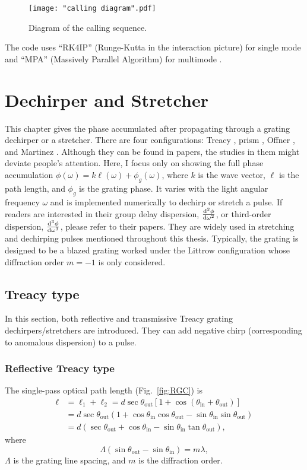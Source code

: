 \documentclass[12pt,hidelinks]{book}
\begin{document}
\begin{figure}[h!]
\centering
\texttt{[image: "calling diagram".pdf]}
\caption{Diagram of the calling sequence.}
\label{fig:calling}
\end{figure}

The code uses ``RK4IP'' (Runge-Kutta in the interaction picture) for single mode \cite{Heidt2009,Balac2013} and ``MPA'' (Massively Parallel Algorithm) for multimode \cite{Wright2018}.

\chapter{Dechirper and Stretcher}
This chapter gives the phase accumulated after propagating through a grating dechirper or a stretcher. There are four configurations: Treacy \cite{Treacy1969}, prism \cite{Dietel1983,Fork1984}, Offner \cite{Offner1971}, and Martinez \cite{Martinez1984,Martinez1985}. Although they can be found in papers, the studies in them might deviate people's attention. Here, I focus only on showing the full phase accumulation $\phi(\omega)=k\ell(\omega)+\phi_g(\omega)$, where $k$ is the wave vector, $\ell$ is the path length, and $\phi_g$ is the grating phase. It varies with the light angular frequency $\omega$ and is implemented numerically to dechirp or stretch a pulse. If readers are interested in their group delay dispersion, $\od[2]{\phi}{\omega}$, or third-order dispersion, $\od[3]{\phi}{\omega}$, please refer to their papers. They are widely used in stretching and dechirping pulses mentioned throughout this thesis. Typically, the grating is designed to be a blazed grating worked under the Littrow configuration whose diffraction order $m=-1$ is only considered.

\section{Treacy type}
In this section, both reflective and transmissive Treacy grating dechirpers/stretchers are introduced. They can add negative chirp (corresponding to anomalous dispersion) to a pulse.

\subsection{Reflective Treacy type}
\label{sec:reflective_grating_pair}
The single-pass optical path length (Fig.~\ref{fig:RGC}) is
\begin{align}
\ell & =\ell_1+\ell_2=d\sec\theta_{\text{out}}\left[1+\cos(\theta_{\text{in}}+\theta_{\text{out}})\right] \nonumber \\
& =d\sec\theta_{\text{out}}\left(1+\cos\theta_{\text{in}}\cos\theta_{\text{out}}-\sin\theta_{\text{in}}\sin\theta_{\text{out}}\right) \nonumber \\
& =d\left(\sec\theta_{\text{out}}+\cos\theta_{\text{in}}-\sin\theta_{\text{in}}\tan\theta_{\text{out}}\right),
\end{align}
where
\begin{equation}
\Lambda\left(\sin\theta_{\text{out}}-\sin\theta_{\text{in}}\right)=m\lambda,
\end{equation}
$\Lambda$ is the grating line spacing, and $m$ is the diffraction order.
\end{document}
